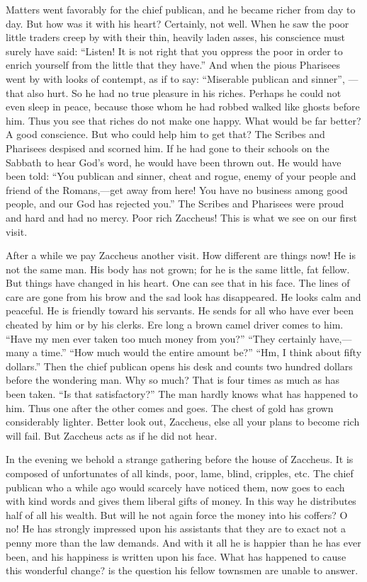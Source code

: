 Matters went favorably for the chief publican, and he became richer from day to day. But how was it with his heart? Certainly, not well. When he saw the poor little traders creep by with their thin, heavily laden asses, his conscience must surely have said: “Listen! It is not right that you oppress the poor in order to enrich yourself from the little that they have.” And when the pious Pharisees went by with looks of contempt, as if to say: “Miserable publican and sinner”,
—that also hurt. So he had no true pleasure in his riches. Perhaps he could not even sleep in peace, because those whom he had robbed walked like ghosts before him. Thus you see that riches do not make one happy. What would be far better? A good conscience. But who could help him to get that? The Scribes and Pharisees despised and scorned him. If he had gone to their schools on the Sabbath to hear God’s word, he would have been thrown out. He would have been told: “You publican and sinner, cheat and rogue, enemy of your people and friend of the Romans,—get away from here! You have no business among good people, and our God has rejected you.” The Scribes and Pharisees were proud and hard and had no mercy. Poor rich Zaccheus! This is what we see on our first visit.

After a while we pay Zaccheus another visit. How different are things now! He is not the same man. His body has not grown; for he is the same little, fat fellow. But things have changed in his heart. One can see that in his face. The lines of care are gone from his brow and the sad look has disappeared. He looks calm and peaceful. He is friendly toward his servants. He sends for all who have ever been cheated by him or by his clerks. Ere long a brown camel driver comes to him. “Have my men ever taken too much money from you?” “They certainly have,—many a time.” “How much would the entire amount be?” “Hm, I think about fifty dollars.” Then the chief publican opens his desk and counts two hundred dollars before the wondering man. Why so much? That is four times as much as has been taken. “Is that satisfactory?” The man hardly knows what has happened to him. Thus one after the other comes and goes. The chest of gold has grown considerably lighter. Better look out, Zaccheus, else all your plans to become rich will fail. But Zaccheus acts as if he did not hear.

In the evening we behold a strange gathering before the house of Zaccheus. It is composed of unfortunates of all kinds, poor, lame, blind, cripples, etc. The chief publican who a while ago would scarcely have noticed them, now goes to each with kind words and gives them liberal gifts of money. In this way he distributes half of all his wealth. But will he not again force the money into his coffers? O no! He has strongly impressed upon his assistants that they are to exact not a penny more than the law demands. And with it all he is happier than he has ever been, and his happiness is written upon his face. What has happened to cause this wonderful change? is the question his fellow townsmen are unable to answer.

